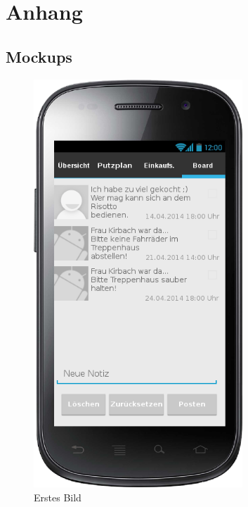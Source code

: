 \chapter{Anhang}
\section{Mockups}
\begin{figure}[htbp] 
  \centering
     \includegraphics[width=0.7\textwidth]{anhang/mockups/blackboard.png}
  \caption{Erstes Bild}
  \label{fig:Bild1}
\end{figure}

